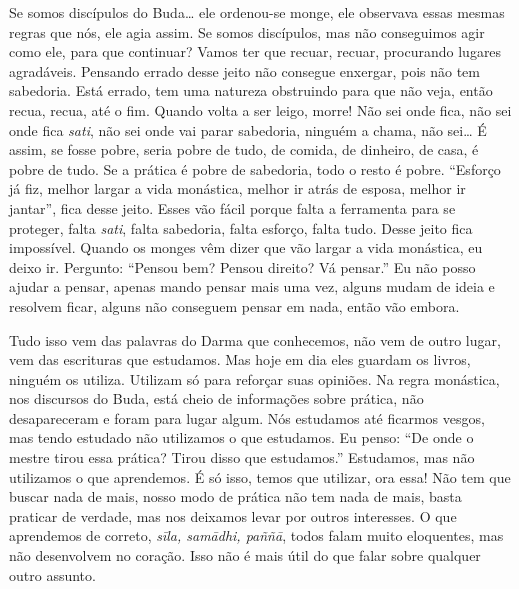 Se somos discípulos do Buda… ele ordenou-se monge, ele observava
essas mesmas regras que nós, ele agia assim. Se somos discípulos, mas
não conseguimos agir como ele, para que continuar? Vamos ter que
recuar, recuar, procurando lugares agradáveis. Pensando errado desse
jeito não consegue enxergar, pois não tem sabedoria. Está errado, tem
uma natureza obstruindo para que não veja, então recua, recua, até o
fim. Quando volta a ser leigo, morre! Não sei onde fica, não sei onde
fica \textit{sati}, não sei onde vai parar sabedoria, ninguém a chama,
não sei… É assim, se fosse pobre, seria pobre de tudo, de comida, de
dinheiro, de casa, é pobre de tudo. Se a prática é pobre de sabedoria,
todo o resto é pobre. “Esforço já fiz, melhor largar a vida monástica,
melhor ir atrás de esposa, melhor ir jantar”, fica desse jeito. Esses
vão fácil porque falta a ferramenta para se proteger, falta
\textit{sati}, falta sabedoria, falta esforço, falta tudo. Desse jeito
fica impossível. Quando os monges vêm dizer que vão largar a vida
monástica, eu deixo ir. Pergunto: “Pensou bem? Pensou direito? Vá
pensar.” Eu não posso ajudar a pensar, apenas mando pensar mais uma
vez, alguns mudam de ideia e resolvem ficar, alguns não conseguem
pensar em nada, então vão embora. 

Tudo isso vem das palavras do Darma que conhecemos, não vem de outro
lugar, vem das escrituras que estudamos. Mas hoje em dia eles guardam
os livros, ninguém os utiliza. Utilizam só para reforçar suas opiniões.
Na regra monástica, nos discursos do Buda, está cheio de informações
sobre prática, não desapareceram e foram para lugar algum. Nós
estudamos até ficarmos vesgos, mas tendo estudado não utilizamos o que
estudamos. Eu penso: “De onde o mestre tirou essa prática? Tirou disso
que estudamos.” Estudamos, mas não utilizamos o que aprendemos. É só
isso, temos que utilizar, ora essa! Não tem que buscar nada de mais,
nosso modo de prática não tem nada de mais, basta praticar de verdade,
mas nos deixamos levar por outros interesses. O que aprendemos de
correto, \textit{sīla, sam\=adhi, paññ\=a}, todos falam muito
eloquentes, mas não desenvolvem no coração. Isso não é mais útil do que
falar sobre qualquer outro assunto. 

